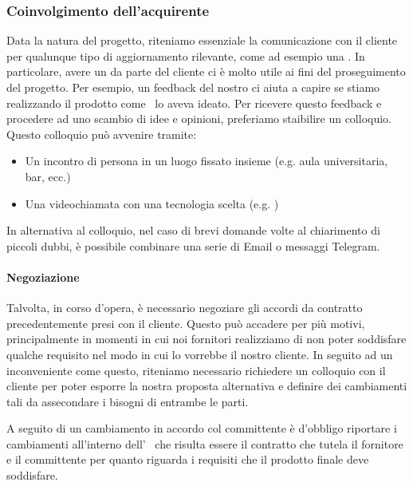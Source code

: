         
        \subsubsection{Coinvolgimento dell'acquirente} \label{ConivolgimentoAcquirente}
        Data la natura del progetto, riteniamo essenziale la comunicazione con il cliente per qualunque tipo di aggiornamento rilevante, come ad esempio una .
        In particolare, avere un  da parte del cliente ci è molto utile ai fini del proseguimento del progetto.
        Per esempio, un feedback del nostro  ci aiuta a capire se stiamo realizzando il prodotto come \II\ lo aveva ideato.
        Per ricevere questo feedback e procedere ad uno scambio di idee e opinioni, preferiamo staibilire un colloquio.
        Questo colloquio può avvenire tramite:
        \begin{itemize}
            \item Un incontro di persona in un luogo fissato insieme (e.g. aula universitaria, bar, ecc.)
            \item Una videochiamata con una tecnologia scelta (e.g. )
        \end{itemize}
        In alternativa al colloquio, nel caso di brevi domande volte al chiarimento di piccoli dubbi, è possibile combinare una serie di Email o messaggi Telegram.
        
        \paragraph{Negoziazione} \label{Negoziazione}
        Talvolta, in corso d'opera, è necessario negoziare gli accordi da contratto precedentemente presi con il cliente.
        Questo può accadere per più motivi, principalmente in momenti in cui noi fornitori realizziamo di non poter soddisfare qualche requisito nel modo in cui lo vorrebbe il nostro cliente.
        In seguito ad un inconveniente come questo, riteniamo necessario richiedere un colloquio con il cliente per poter esporre la nostra proposta alternativa e definire dei cambiamenti tali da assecondare i bisogni di entrambe le parti. \par
        A seguito di un cambiamento in accordo col committente è d'obbligo riportare i cambiamenti all'interno dell'\AdRd~ che risulta essere il contratto che tutela il fornitore e il committente per quanto riguarda i requisiti che il prodotto finale deve soddisfare.
        

